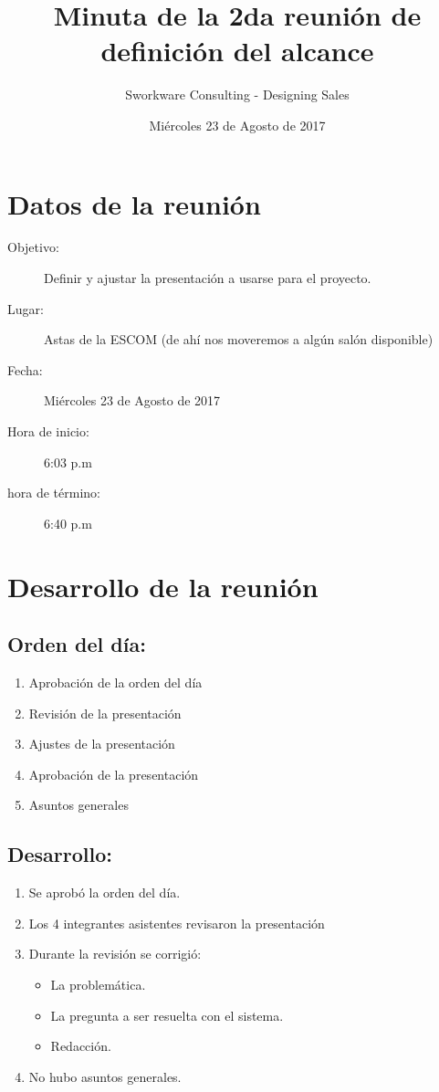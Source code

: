 \documentclass[12pt]{article}
\title{Minuta de la 2da reunión de definición del alcance}
\author{Sworkware Consulting - Designing Sales}
\date{Miércoles 23 de Agosto de 2017} %
\begin{document}
\maketitle
\tableofcontents

\section{Datos de la reunión}
\begin{description}
	\item[Objetivo:] Definir y ajustar la presentación a usarse para el proyecto.
	\item[Lugar:] Astas de la ESCOM (de ahí nos moveremos a algún salón disponible)
	\item[Fecha:] Miércoles 23 de Agosto de 2017
	\item[Hora de inicio:] 6:03 p.m
	\item[hora de término:] 6:40 p.m
\end{description}

\section{Desarrollo de la reunión}

\subsection{Orden del día:}
\begin{enumerate}
 	\item Aprobación de la orden del día
	\item Revisión de la presentación
	\item Ajustes de la presentación
	\item Aprobación de la presentación
	\item Asuntos generales
\end{enumerate}

\subsection{Desarrollo:}
\begin{enumerate}
 	\item Se aprobó la orden del día.
	\item Los 4 integrantes asistentes revisaron la presentación
	\item Durante la revisión se corrigió:
	\begin{itemize}
		\item  La problemática.
		\item La pregunta a ser resuelta con el sistema.
 		\item  Redacción.
	\end{itemize}
 	\item No hubo asuntos generales.
\end{enumerate}
\end{document}

